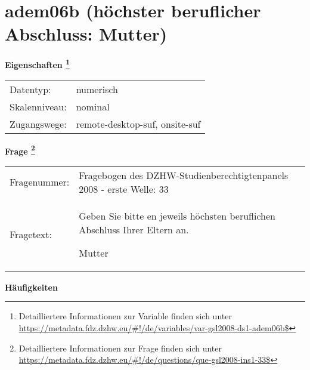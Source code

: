 
    \setcounter{footnote}{0}

    \vspace*{-1.8cm}
	\section{adem06b (höchster beruflicher Abschluss: Mutter)}
	\label{section:adem06b}



    \vspace*{0.5cm}
    \noindent\textbf{Eigenschaften
	\footnote{Detailliertere Informationen zur Variable finden sich unter
		\url{https://metadata.fdz.dzhw.eu/\#!/de/variables/var-gsl2008-ds1-adem06b$}}}\\
	\begin{tabularx}{\hsize}{@{}lX}
	Datentyp: & numerisch \\
	Skalenniveau: & nominal \\
	Zugangswege: &
	  remote-desktop-suf, 
	  onsite-suf
 \\
    \end{tabularx}



				\vspace*{0.5cm}
                \noindent\textbf{Frage
	                \footnote{Detailliertere Informationen zur Frage finden sich unter
		              \url{https://metadata.fdz.dzhw.eu/\#!/de/questions/que-gsl2008-ins1-33$}}}\\
				\begin{tabularx}{\hsize}{@{}lX}
					Fragenummer: &
					  Fragebogen des DZHW-Studienberechtigtenpanels 2008 - erste Welle:
					  33
 \\
					Fragetext: & Geben Sie bitte en jeweils höchsten beruflichen Abschluss Ihrer Eltern an.\par  Mutter \\
				\end{tabularx}





        		\vspace*{0.5cm}
                \noindent\textbf{Häufigkeiten}


